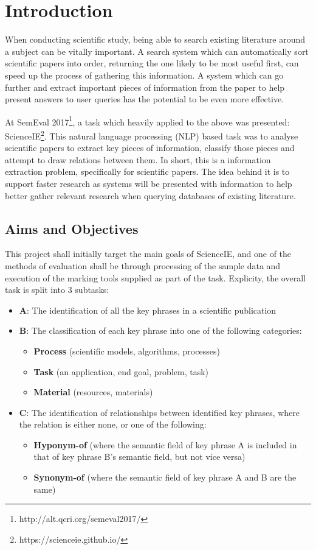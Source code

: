 \section{Introduction}

When conducting scientific study, being able to search existing literature around a subject can be vitally important. A search system which can automatically sort scientific papers into order, returning the one likely to be most useful first, can speed up the process of gathering this information. A system which can go further and extract important pieces of information from the paper to help present answers to user queries has the potential to be even more effective.

At SemEval 2017\footnote{http://alt.qcri.org/semeval2017/}, a task which heavily applied to the above was presented: ScienceIE\footnote{https://scienceie.github.io/}. This natural language processing (NLP) based task was to analyse scientific papers to extract key pieces of information, classify those pieces and attempt to draw relations between them. In short, this is a information extraction problem, specifically for scientific papers. The idea behind it is to support faster research as systems will be presented with information to help better gather relevant research when querying databases of existing literature.

\subsection{Aims and Objectives}

This project shall initially target the main goals of ScienceIE, and one of the methods of evaluation shall be through processing of the sample data and execution of the marking tools supplied as part of the task. Explicity, the overall task is split into 3 subtasks:

\begin{itemize}
	\item \textbf{A}: The identification of all the key phrases in a scientific publication
	\item \textbf{B}: The classification of each key phrase into one of the following categories:
	\begin{itemize}
		\item \textbf{Process} (scientific models, algorithms, processes)
		\item \textbf{Task} (an application, end goal, problem, task)
		\item \textbf{Material} (resources, materials)
	\end{itemize}
	\item \textbf{C}: The identification of relationships between identified key phrases, where the relation is either none, or one of the following:
	\begin{itemize}
		\item \textbf{Hyponym-of} (where the semantic field of key phrase A is included in that of key phrase B's semantic field, but not vice versa)
		\item \textbf{Synonym-of} (where the semantic field of key phrase A and B are the same)
	\end{itemize}
\end{itemize}


